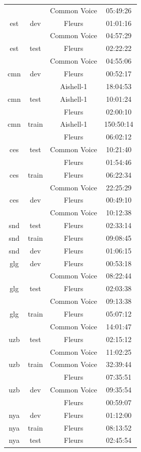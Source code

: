 \begin{longtable}{cccc}
 & & Common Voice & 05:49:26 \\ 
est & dev & Fleurs & 01:01:16 \\ 
 & & Common Voice & 04:57:29 \\ 
est & test & Fleurs & 02:22:22 \\ 
 & & Common Voice & 04:55:06 \\ \midrule
cmn & dev & Fleurs & 00:52:17 \\ 
 & & Aishell-1 & 18:04:53 \\ 
cmn & test & Aishell-1 & 10:01:24 \\ 
 & & Fleurs & 02:00:10 \\ 
cmn & train & Aishell-1 & 150:50:14 \\ 
 & & Fleurs & 06:02:12 \\ \midrule
ces & test & Common Voice & 10:21:40 \\ 
 & & Fleurs & 01:54:46 \\ 
ces & train & Fleurs & 06:22:34 \\ 
 & & Common Voice & 22:25:29 \\ 
ces & dev & Fleurs & 00:49:10 \\ 
 & & Common Voice & 10:12:38 \\ \midrule
snd & test & Fleurs & 02:33:14 \\ 
snd & train & Fleurs & 09:08:45 \\ 
snd & dev & Fleurs & 01:06:15 \\ \midrule
glg & dev & Fleurs & 00:53:18 \\ 
 & & Common Voice & 08:22:44 \\ 
glg & test & Fleurs & 02:03:38 \\ 
 & & Common Voice & 09:13:38 \\ 
glg & train & Fleurs & 05:07:12 \\ 
 & & Common Voice & 14:01:47 \\ \midrule
uzb & test & Fleurs & 02:15:12 \\ 
 & & Common Voice & 11:02:25 \\ 
uzb & train & Common Voice & 32:39:44 \\ 
 & & Fleurs & 07:35:51 \\ 
uzb & dev & Common Voice & 09:35:54 \\ 
 & & Fleurs & 00:59:07 \\ \midrule
nya & dev & Fleurs & 01:12:00 \\ 
nya & train & Fleurs & 08:13:52 \\ 
nya & test & Fleurs & 02:45:54 \\ \midrule

\end{longtable}

